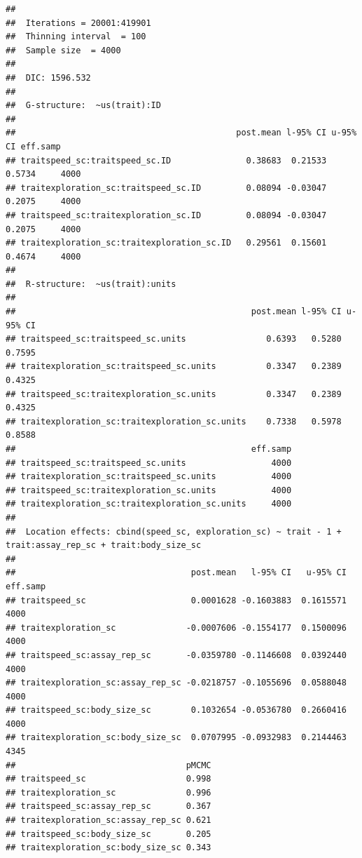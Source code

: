 \documentclass[
  12pt,
]{book}
\newenvironment{Shaded}{\begin{snugshade}}{\end{snugshade}}
\newcommand{\DecValTok}[1]{\textcolor[rgb]{0.00,0.00,0.81}{#1}}
\newcommand{\KeywordTok}[1]{\textcolor[rgb]{0.13,0.29,0.53}{\textbf{#1}}}
\newcommand{\NormalTok}[1]{#1}
\newcommand{\OperatorTok}[1]{\textcolor[rgb]{0.81,0.36,0.00}{\textbf{#1}}}
\newcommand{\StringTok}[1]{\textcolor[rgb]{0.31,0.60,0.02}{#1}}
\begin{document}
\begin{verbatim}
## 
##  Iterations = 20001:419901
##  Thinning interval  = 100
##  Sample size  = 4000 
## 
##  DIC: 1596.532 
## 
##  G-structure:  ~us(trait):ID
## 
##                                            post.mean l-95% CI u-95% CI eff.samp
## traitspeed_sc:traitspeed_sc.ID               0.38683  0.21533   0.5734     4000
## traitexploration_sc:traitspeed_sc.ID         0.08094 -0.03047   0.2075     4000
## traitspeed_sc:traitexploration_sc.ID         0.08094 -0.03047   0.2075     4000
## traitexploration_sc:traitexploration_sc.ID   0.29561  0.15601   0.4674     4000
## 
##  R-structure:  ~us(trait):units
## 
##                                               post.mean l-95% CI u-95% CI
## traitspeed_sc:traitspeed_sc.units                0.6393   0.5280   0.7595
## traitexploration_sc:traitspeed_sc.units          0.3347   0.2389   0.4325
## traitspeed_sc:traitexploration_sc.units          0.3347   0.2389   0.4325
## traitexploration_sc:traitexploration_sc.units    0.7338   0.5978   0.8588
##                                               eff.samp
## traitspeed_sc:traitspeed_sc.units                 4000
## traitexploration_sc:traitspeed_sc.units           4000
## traitspeed_sc:traitexploration_sc.units           4000
## traitexploration_sc:traitexploration_sc.units     4000
## 
##  Location effects: cbind(speed_sc, exploration_sc) ~ trait - 1 + trait:assay_rep_sc + trait:body_size_sc 
## 
##                                   post.mean   l-95% CI   u-95% CI eff.samp
## traitspeed_sc                     0.0001628 -0.1603883  0.1615571     4000
## traitexploration_sc              -0.0007606 -0.1554177  0.1500096     4000
## traitspeed_sc:assay_rep_sc       -0.0359780 -0.1146608  0.0392440     4000
## traitexploration_sc:assay_rep_sc -0.0218757 -0.1055696  0.0588048     4000
## traitspeed_sc:body_size_sc        0.1032654 -0.0536780  0.2660416     4000
## traitexploration_sc:body_size_sc  0.0707995 -0.0932983  0.2144463     4345
##                                  pMCMC
## traitspeed_sc                    0.998
## traitexploration_sc              0.996
## traitspeed_sc:assay_rep_sc       0.367
## traitexploration_sc:assay_rep_sc 0.621
## traitspeed_sc:body_size_sc       0.205
## traitexploration_sc:body_size_sc 0.343
\end{verbatim}

\begin{Shaded}
\end{Shaded}
\end{document}

